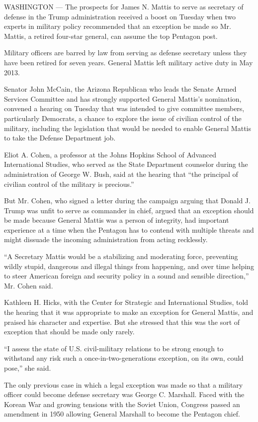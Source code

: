 WASHINGTON --- The prospects for James N. Mattis to serve as secretary
of defense in the Trump administration received a boost on Tuesday when
two experts in military policy recommended that an exception be made so
Mr. Mattis, a retired four-star general, can assume the top Pentagon
post.

Military officers are barred by law from serving as defense secretary
unless they have been retired for seven years. General Mattis left
military active duty in May 2013.

Senator John McCain, the Arizona Republican who leads the Senate Armed
Services Committee and has strongly supported General Mattis's
nomination, convened a hearing on Tuesday that was intended to give
committee members, particularly Democrats, a chance to explore the issue
of civilian control of the military, including the legislation that
would be needed to enable General Mattis to take the Defense Department
job.

Eliot A. Cohen, a professor at the Johns Hopkins School of Advanced
International Studies, who served as the State Department counselor
during the administration of George W. Bush, said at the hearing that
``the principal of civilian control of the military is precious.''

But Mr. Cohen, who signed a letter during the campaign arguing that
Donald J. Trump was unfit to serve as commander in chief, argued that an
exception should be made because General Mattis was a person of
integrity, had important experience at a time when the Pentagon has to
contend with multiple threats and might dissuade the incoming
administration from acting recklessly.

``A Secretary Mattis would be a stabilizing and moderating force,
preventing wildly stupid, dangerous and illegal things from happening,
and over time helping to steer American foreign and security policy in a
sound and sensible direction,'' Mr. Cohen said.

Kathleen H. Hicks, with the Center for Strategic and International
Studies, told the hearing that it was appropriate to make an exception
for General Mattis, and praised his character and expertise. But she
stressed that this was the sort of exception that should be made only
rarely.

``I assess the state of U.S. civil-military relations to be strong
enough to withstand any risk such a once-in-two-generations exception,
on its own, could pose,'' she said.

The only previous case in which a legal exception was made so that a
military officer could become defense secretary was George C. Marshall.
Faced with the Korean War and growing tensions with the Soviet Union,
Congress passed an amendment in 1950 allowing General Marshall to become
the Pentagon chief.

